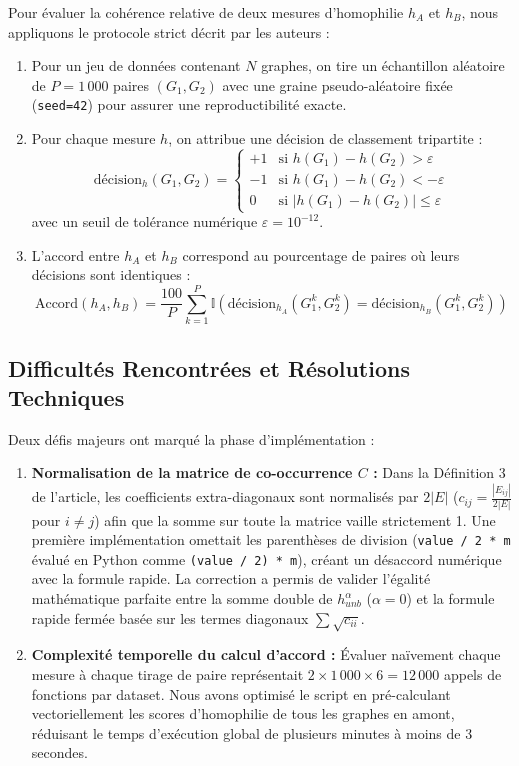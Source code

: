 \documentclass[11pt,a4paper]{article}
\begin{document}
Pour évaluer la cohérence relative de deux mesures d'homophilie $h_A$ et $h_B$, nous appliquons le protocole strict décrit par les auteurs :
\begin{enumerate}[leftmargin=1.5em]
    \item Pour un jeu de données contenant $N$ graphes, on tire un échantillon aléatoire de $P = 1\,000$ paires $(G_1, G_2)$ avec une graine pseudo-aléatoire fixée (\texttt{seed=42}) pour assurer une reproductibilité exacte.
    \item Pour chaque mesure $h$, on attribue une décision de classement tripartite :
    \begin{equation}
        \text{décision}_h(G_1, G_2) = 
        \begin{cases}
            +1 & \text{si } h(G_1) - h(G_2) > \varepsilon \\
            -1 & \text{si } h(G_1) - h(G_2) < -\varepsilon \\
            0  & \text{si } |h(G_1) - h(G_2)| \le \varepsilon
        \end{cases}
    \end{equation}
    avec un seuil de tolérance numérique $\varepsilon = 10^{-12}$.
    \item L'accord entre $h_A$ et $h_B$ correspond au pourcentage de paires où leurs décisions sont identiques :
    \begin{equation}
        \text{Accord}(h_A, h_B) = \frac{100}{P} \sum_{k=1}^P \mathbb{I}\left( \text{décision}_{h_A}(G_1^k, G_2^k) = \text{décision}_{h_B}(G_1^k, G_2^k) \right)
    \end{equation}
\end{enumerate}

\subsection{Difficultés Rencontrées et Résolutions Techniques}

Deux défis majeurs ont marqué la phase d'implémentation :
\begin{enumerate}[leftmargin=1.5em]
    \item \textbf{Normalisation de la matrice de co-occurrence $C$ :} Dans la Définition 3 de l'article, les coefficients extra-diagonaux sont normalisés par $2|E|$ ($c_{ij} = \frac{|E_{ij}|}{2|E|}$ pour $i \neq j$) afin que la somme sur toute la matrice vaille strictement 1. Une première implémentation omettait les parenthèses de division (\texttt{value / 2 * m} évalué en Python comme \texttt{(value / 2) * m}), créant un désaccord numérique avec la formule rapide. La correction a permis de valider l'égalité mathématique parfaite entre la somme double de $h_{unb}^\alpha$ ($\alpha=0$) et la formule rapide fermée basée sur les termes diagonaux $\sum \sqrt{c_{ii}}$.
    \item \textbf{Complexité temporelle du calcul d'accord :} Évaluer naïvement chaque mesure à chaque tirage de paire représentait $2 \times 1\,000 \times 6 = 12\,000$ appels de fonctions par dataset. Nous avons optimisé le script en pré-calculant vectoriellement les scores d'homophilie de tous les graphes en amont, réduisant le temps d'exécution global de plusieurs minutes à moins de 3 secondes.
\end{enumerate}
\end{document}
